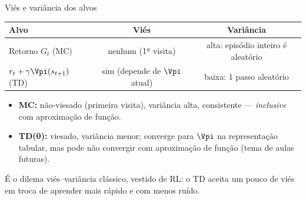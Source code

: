 \documentclass[aspectratio=169, 11pt]{beamer}
\begin{document}
\begin{frame}{Viés e variância dos alvos}
  \begin{center}
  \renewcommand{\arraystretch}{1.35}
  \begin{tabular}{lcc}
    \textbf{Alvo} & \textbf{Viés} & \textbf{Variância}\\ \hline
    Retorno $G_t$ (MC)
      & nenhum (1ª visita) & alta: episódio inteiro é aleatório\\
    $r_t + \gamma \Vpi(s_{t+1})$ (TD)
      & sim (depende de $\Vpi$ atual) & baixa: 1 passo aleatório\\
  \end{tabular}
  \end{center}

  \begin{itemize}
    \item \textbf{MC:} não-viesado (primeira visita), variância alta,
      consistente — \emph{inclusive} com aproximação de função.
    \item \textbf{TD(0):} viesado, variância menor; converge para $\Vpi$
      na representação tabular, mas \alert{pode não convergir com
      aproximação de função} (tema de aulas futuras).
  \end{itemize}

  \begin{ideiabox}
    É o dilema viés–variância clássico, vestido de RL: o TD aceita um
    pouco de viés em troca de aprender mais rápido e com menos ruído.
  \end{ideiabox}
\end{frame}
\end{document}
